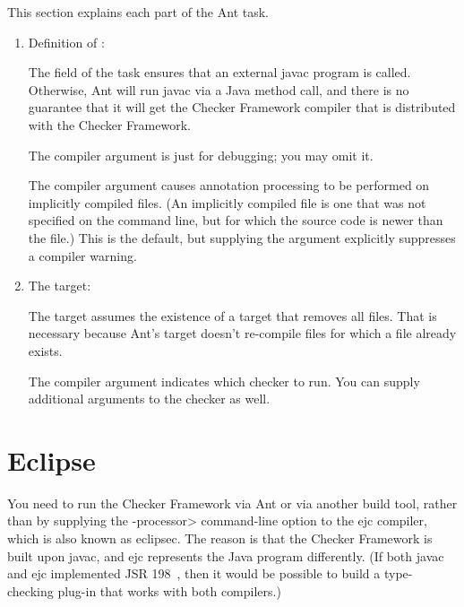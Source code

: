 This section explains each part of the Ant task.

\begin{enumerate}
\item Definition of :

The  field of the  task
ensures that an external javac program is called.  Otherwise, Ant will run
javac via a Java method call, and there is no guarantee that it will get
the Checker Framework compiler that is distributed with the Checker Framework.

The  compiler argument is just for debugging; you may omit
it.

The  compiler argument causes annotation processing
to be performed on implicitly compiled files.  (An implicitly compiled file
is one that was not specified on the command line, but for which the source
code is newer than the  file.)  This is the default, but
supplying the argument explicitly suppresses a compiler warning.


\item The  target:

The target assumes the existence of a  target that removes all
 files.  That is necessary because Ant's  target
doesn't re-compile  files for which a  file
already exists.

The  compiler argument indicates which checker to
run.  You can supply additional arguments to the checker as well.

\end{enumerate}


\section{Eclipse\label{eclipse}}


You
need to run the Checker Framework via Ant or via another build tool, rather
than by supplying the \<-processor> command-line option to the ejc
compiler, which is also known as eclipsec.
The reason is that the Checker Framework is built upon javac,
and ejc represents the Java program differently.  (If both javac and ejc
implemented JSR 198~\cite{JSR198}, then it would be possible to build
a type-checking plug-in that works with both compilers.)


